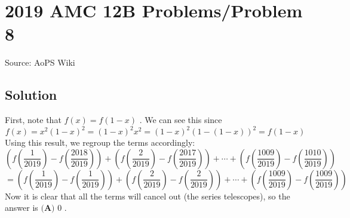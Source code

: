 \documentclass[12pt]{article}
\begin{document}
\section*{{2019 AMC 12B Problems/Problem 8}}
Source: AoPS Wiki

\subsection*{Solution}
First, note that $f(x) = f(1-x)$ . We can see this since \[f(x) = x^2(1-x)^2 = (1-x)^2x^2 = (1-x)^{2}\left(1-\left(1-x\right)\right)^{2} = f(1-x)\] Using this result, we regroup the terms accordingly: \[\left( f \left(\frac{1}{2019} \right) - f \left(\frac{2018}{2019} \right) \right) + \left( f \left(\frac{2}{2019} \right) - f \left(\frac{2017}{2019} \right) \right) + \cdots + \left( f \left(\frac{1009}{2019} \right) - f \left(\frac{1010}{2019} \right) \right)\] \[= \left( f \left(\frac{1}{2019} \right) - f \left(\frac{1}{2019} \right) \right) + \left( f \left(\frac{2}{2019} \right) - f \left(\frac{2}{2019} \right) \right) + \cdots + \left( f \left(\frac{1009}{2019} \right) - f \left(\frac{1009}{2019} \right) \right)\] Now it is clear that all the terms will cancel out (the series telescopes), so the answer is $\boxed{\textbf{(A) }0}$ .
\end{document}
